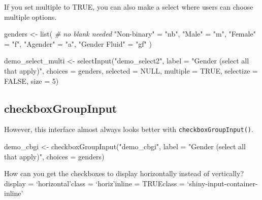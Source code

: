 \documentclass[
  oneside]{book}
\newenvironment{Shaded}{\begin{snugshade}}{\end{snugshade}}
\newcommand{\AttributeTok}[1]{\textcolor[rgb]{0.77,0.63,0.00}{#1}}
\newcommand{\CommentTok}[1]{\textcolor[rgb]{0.56,0.35,0.01}{\textit{#1}}}
\newcommand{\ConstantTok}[1]{\textcolor[rgb]{0.00,0.00,0.00}{#1}}
\newcommand{\DecValTok}[1]{\textcolor[rgb]{0.00,0.00,0.81}{#1}}
\newcommand{\FunctionTok}[1]{\textcolor[rgb]{0.00,0.00,0.00}{#1}}
\newcommand{\NormalTok}[1]{#1}
\newcommand{\OtherTok}[1]{\textcolor[rgb]{0.56,0.35,0.01}{#1}}
\newcommand{\StringTok}[1]{\textcolor[rgb]{0.31,0.60,0.02}{#1}}
\begin{document}
If you set \AttributeTok{multiple} to \ConstantTok{TRUE}, you can also make a select where users can choose multiple options.

\begin{Shaded}
\begin{Highlighting}[]
\NormalTok{genders }\OtherTok{\textless{}{-}} \FunctionTok{list}\NormalTok{( }\CommentTok{\# no blank needed}
  \StringTok{"Non{-}binary"} \OtherTok{=} \StringTok{"nb"}\NormalTok{,}
  \StringTok{"Male"} \OtherTok{=} \StringTok{"m"}\NormalTok{,}
  \StringTok{"Female"} \OtherTok{=} \StringTok{"f"}\NormalTok{,}
  \StringTok{"Agender"} \OtherTok{=} \StringTok{"a"}\NormalTok{,}
  \StringTok{"Gender Fluid"} \OtherTok{=} \StringTok{"gf"}
\NormalTok{)}

\NormalTok{demo\_select\_multi }\OtherTok{\textless{}{-}} 
  \FunctionTok{selectInput}\NormalTok{(}\StringTok{"demo\_select2"}\NormalTok{, }
              \AttributeTok{label =} \StringTok{"Gender (select all that apply)"}\NormalTok{, }
              \AttributeTok{choices =}\NormalTok{ genders,}
              \AttributeTok{selected =} \ConstantTok{NULL}\NormalTok{,}
              \AttributeTok{multiple =} \ConstantTok{TRUE}\NormalTok{, }
              \AttributeTok{selectize =} \ConstantTok{FALSE}\NormalTok{,}
              \AttributeTok{size =} \DecValTok{5}\NormalTok{)}
\end{Highlighting}
\end{Shaded}

\hypertarget{checkboxgroupinput}{%
\subsection{checkboxGroupInput}\label{checkboxgroupinput}}

However, this interface almost always looks better with \texttt{checkboxGroupInput}\texttt{()}.

\begin{Shaded}
\begin{Highlighting}[]
\NormalTok{demo\_cbgi }\OtherTok{\textless{}{-}}
  \FunctionTok{checkboxGroupInput}\NormalTok{(}\StringTok{"demo\_cbgi"}\NormalTok{,}
                     \AttributeTok{label =} \StringTok{"Gender (select all that apply)"}\NormalTok{,}
                     \AttributeTok{choices =}\NormalTok{ genders)}
\end{Highlighting}
\end{Shaded}

How can you get the checkboxes to display horizontally instead of vertically?\\
display = `horizontal'class = `horiz'inline = TRUEclass = `shiny-input-container-inline'
\end{document}
